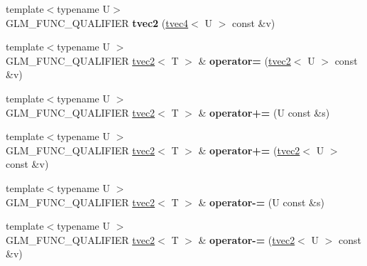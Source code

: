 \begin{DoxyCompactItemize}
\item 
\hypertarget{structglm_1_1detail_1_1tvec2_acd687b5536fe7df9c3b822c01e9529ae}{{\footnotesize template$<$typename U$>$ }\\G\-L\-M\-\_\-\-F\-U\-N\-C\-\_\-\-Q\-U\-A\-L\-I\-F\-I\-E\-R {\bfseries tvec2} (\hyperlink{structglm_1_1detail_1_1tvec4}{tvec4}$<$ U $>$ const \&v)}\label{structglm_1_1detail_1_1tvec2_acd687b5536fe7df9c3b822c01e9529ae}

\item 
\hypertarget{structglm_1_1detail_1_1tvec2_ab18840eb7315fc5ca72a8420ee75d96c}{{\footnotesize template$<$typename U $>$ }\\G\-L\-M\-\_\-\-F\-U\-N\-C\-\_\-\-Q\-U\-A\-L\-I\-F\-I\-E\-R \hyperlink{structglm_1_1detail_1_1tvec2}{tvec2}$<$ T $>$ \& {\bfseries operator=} (\hyperlink{structglm_1_1detail_1_1tvec2}{tvec2}$<$ U $>$ const \&v)}\label{structglm_1_1detail_1_1tvec2_ab18840eb7315fc5ca72a8420ee75d96c}

\item 
\hypertarget{structglm_1_1detail_1_1tvec2_af6a460a51dd11423576307ff14c26800}{{\footnotesize template$<$typename U $>$ }\\G\-L\-M\-\_\-\-F\-U\-N\-C\-\_\-\-Q\-U\-A\-L\-I\-F\-I\-E\-R \hyperlink{structglm_1_1detail_1_1tvec2}{tvec2}$<$ T $>$ \& {\bfseries operator+=} (U const \&s)}\label{structglm_1_1detail_1_1tvec2_af6a460a51dd11423576307ff14c26800}

\item 
\hypertarget{structglm_1_1detail_1_1tvec2_ac76e2fce823e8c359ead7736969bffcf}{{\footnotesize template$<$typename U $>$ }\\G\-L\-M\-\_\-\-F\-U\-N\-C\-\_\-\-Q\-U\-A\-L\-I\-F\-I\-E\-R \hyperlink{structglm_1_1detail_1_1tvec2}{tvec2}$<$ T $>$ \& {\bfseries operator+=} (\hyperlink{structglm_1_1detail_1_1tvec2}{tvec2}$<$ U $>$ const \&v)}\label{structglm_1_1detail_1_1tvec2_ac76e2fce823e8c359ead7736969bffcf}

\item 
\hypertarget{structglm_1_1detail_1_1tvec2_ac3f2caa2ff367338645dd4157e966ba9}{{\footnotesize template$<$typename U $>$ }\\G\-L\-M\-\_\-\-F\-U\-N\-C\-\_\-\-Q\-U\-A\-L\-I\-F\-I\-E\-R \hyperlink{structglm_1_1detail_1_1tvec2}{tvec2}$<$ T $>$ \& {\bfseries operator-\/=} (U const \&s)}\label{structglm_1_1detail_1_1tvec2_ac3f2caa2ff367338645dd4157e966ba9}

\item 
\hypertarget{structglm_1_1detail_1_1tvec2_ad155e9263dad52b003c608f7c5adcaea}{{\footnotesize template$<$typename U $>$ }\\G\-L\-M\-\_\-\-F\-U\-N\-C\-\_\-\-Q\-U\-A\-L\-I\-F\-I\-E\-R \hyperlink{structglm_1_1detail_1_1tvec2}{tvec2}$<$ T $>$ \& {\bfseries operator-\/=} (\hyperlink{structglm_1_1detail_1_1tvec2}{tvec2}$<$ U $>$ const \&v)}\label{structglm_1_1detail_1_1tvec2_ad155e9263dad52b003c608f7c5adcaea}


\end{DoxyCompactItemize}
